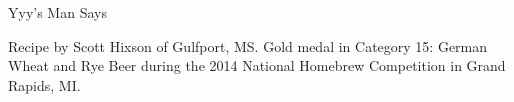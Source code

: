 \begin{recipe}{Yyy's Man Says} %

\begin{aboutblock}
Recipe by Scott Hixson of Gulfport, MS. Gold medal in Category 15: German Wheat
and Rye Beer during the 2014 National Homebrew Competition in Grand Rapids, MI.
\sourceaha
\end{aboutblock}


\begin{methodandtiming}

\begin{mashsteps}
\end{mashsteps}

\begin{fermentationsteps}
\end{fermentationsteps}

\end{methodandtiming}

\recipebreak

\begin{ingredientsblock}

\begin{malts}
\end{malts}

\begin{hops}
\end{hops}


\end{ingredientsblock}

\end{recipe}

